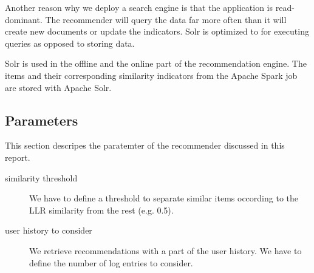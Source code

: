 Another reason why we deploy a search engine is that the application is read-dominant. The recommender will query the data far more often than it will create new documents or update the indicators. Solr is optimized to for executing queries as opposed to storing data.

Solr is used in the offline and the online part of the recommendation engine.
The items and their corresponding similarity indicators from the Apache Spark job are stored with Apache Solr. 

\subsection{Parameters}
\label{sec:parameters}

This section descripes the paratemter of the recommender discussed in this report.
\begin{description}
\item[similarity threshold] We have to define a threshold to separate similar items occording to the LLR similarity from the rest (e.g. 0.5).
\item[user history to consider] We retrieve recommendations with a part of the user history. We have to define the number of log entries to consider.
\end{description}